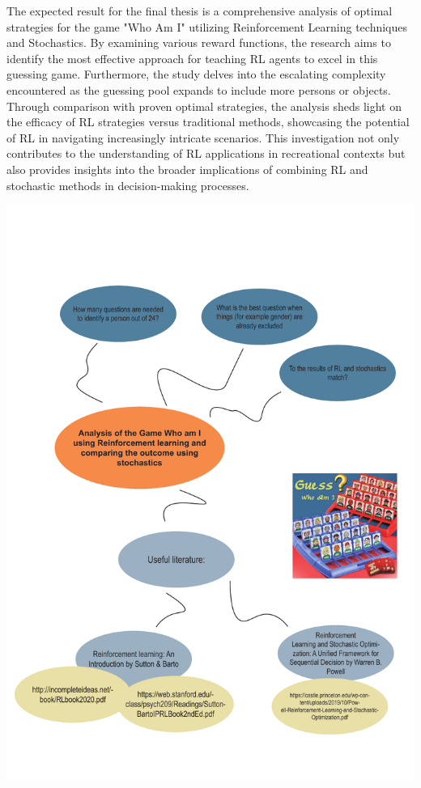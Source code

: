The expected result for the final thesis is a comprehensive analysis of optimal strategies for the game "Who Am I" utilizing Reinforcement Learning techniques and Stochastics. By examining various reward functions, the research aims to identify the most effective approach for teaching RL agents to excel in this guessing game. Furthermore, the study delves into the escalating complexity encountered as the guessing pool expands to include more persons or objects. Through comparison with proven optimal strategies, the analysis sheds light on the efficacy of RL strategies versus traditional methods, showcasing the potential of RL in navigating increasingly intricate scenarios. This investigation not only contributes to the understanding of RL applications in recreational contexts but also provides insights into the broader implications of combining RL and stochastic methods in decision-making processes.

\begin{center}
	\includegraphics[width=\linewidth]{../pdfs/Mindmap.pdf}
\end{center}

